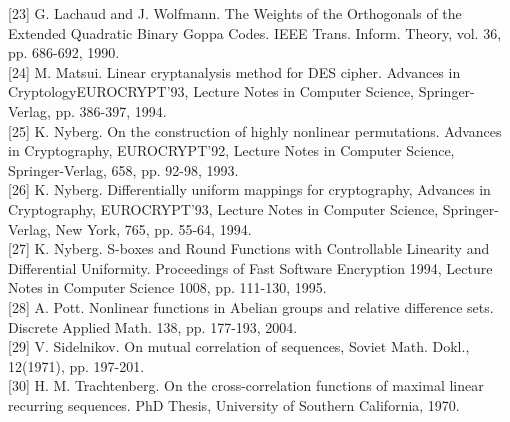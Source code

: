 \documentclass[10pt]{article}
\begin{document}
[23] G. Lachaud and J. Wolfmann. The Weights of the Orthogonals of the Extended Quadratic Binary Goppa Codes. IEEE Trans. Inform. Theory, vol. 36, pp. 686-692, 1990.\\[0pt]
[24] M. Matsui. Linear cryptanalysis method for DES cipher. Advances in CryptologyEUROCRYPT'93, Lecture Notes in Computer Science, Springer-Verlag, pp. 386-397, 1994.\\[0pt]
[25] K. Nyberg. On the construction of highly nonlinear permutations. Advances in Cryptography, EUROCRYPT'92, Lecture Notes in Computer Science, Springer-Verlag, 658, pp. 92-98, 1993.\\[0pt]
[26] K. Nyberg. Differentially uniform mappings for cryptography, Advances in Cryptography, EUROCRYPT'93, Lecture Notes in Computer Science, Springer-Verlag, New York, 765, pp. 55-64, 1994.\\[0pt]
[27] K. Nyberg. S-boxes and Round Functions with Controllable Linearity and Differential Uniformity. Proceedings of Fast Software Encryption 1994, Lecture Notes in Computer Science 1008, pp. 111-130, 1995.\\[0pt]
[28] A. Pott. Nonlinear functions in Abelian groups and relative difference sets. Discrete Applied Math. 138, pp. 177-193, 2004.\\[0pt]
[29] V. Sidelnikov. On mutual correlation of sequences, Soviet Math. Dokl., 12(1971), pp. 197-201.\\[0pt]
[30] H. M. Trachtenberg. On the cross-correlation functions of maximal linear recurring sequences. PhD Thesis, University of Southern California, 1970.
\end{document}
